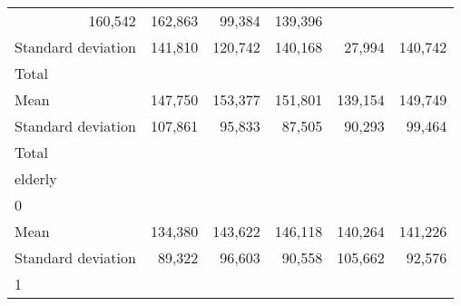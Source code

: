 \begin{tabular}{llllll}
  \multicolumn{1}{r}{160,542} &
  \multicolumn{1}{r}{162,863} &
  \multicolumn{1}{r}{99,384} &
  \multicolumn{1}{r}{139,396} \\
\multicolumn{1}{l}{\hspace{4em}Standard deviation} &
  \multicolumn{1}{|r}{141,810} &
  \multicolumn{1}{r}{120,742} &
  \multicolumn{1}{r}{140,168} &
  \multicolumn{1}{r}{27,994} &
  \multicolumn{1}{r}{140,742} \\
\multicolumn{1}{l}{\hspace{3em}Total} &
  \multicolumn{1}{|r}{} &
  \multicolumn{1}{r}{} &
  \multicolumn{1}{r}{} &
  \multicolumn{1}{r}{} &
  \multicolumn{1}{r}{} \\
\multicolumn{1}{l}{\hspace{4em}Mean} &
  \multicolumn{1}{|r}{147,750} &
  \multicolumn{1}{r}{153,377} &
  \multicolumn{1}{r}{151,801} &
  \multicolumn{1}{r}{139,154} &
  \multicolumn{1}{r}{149,749} \\
\multicolumn{1}{l}{\hspace{4em}Standard deviation} &
  \multicolumn{1}{|r}{107,861} &
  \multicolumn{1}{r}{95,833} &
  \multicolumn{1}{r}{87,505} &
  \multicolumn{1}{r}{90,293} &
  \multicolumn{1}{r}{99,464} \\
\multicolumn{1}{l}{\hspace{1em}Total} &
  \multicolumn{1}{|r}{} &
  \multicolumn{1}{r}{} &
  \multicolumn{1}{r}{} &
  \multicolumn{1}{r}{} &
  \multicolumn{1}{r}{} \\
\multicolumn{1}{l}{\hspace{2em}elderly} &
  \multicolumn{1}{|r}{} &
  \multicolumn{1}{r}{} &
  \multicolumn{1}{r}{} &
  \multicolumn{1}{r}{} &
  \multicolumn{1}{r}{} \\
\multicolumn{1}{l}{\hspace{3em}0} &
  \multicolumn{1}{|r}{} &
  \multicolumn{1}{r}{} &
  \multicolumn{1}{r}{} &
  \multicolumn{1}{r}{} &
  \multicolumn{1}{r}{} \\
\multicolumn{1}{l}{\hspace{4em}Mean} &
  \multicolumn{1}{|r}{134,380} &
  \multicolumn{1}{r}{143,622} &
  \multicolumn{1}{r}{146,118} &
  \multicolumn{1}{r}{140,264} &
  \multicolumn{1}{r}{141,226} \\
\multicolumn{1}{l}{\hspace{4em}Standard deviation} &
  \multicolumn{1}{|r}{89,322} &
  \multicolumn{1}{r}{96,603} &
  \multicolumn{1}{r}{90,558} &
  \multicolumn{1}{r}{105,662} &
  \multicolumn{1}{r}{92,576} \\
\multicolumn{1}{l}{\hspace{3em}1} &

\end{tabular}
